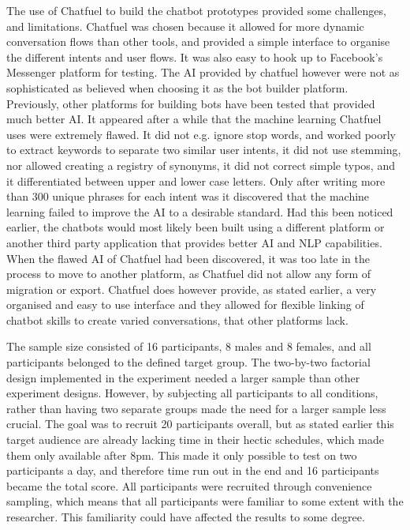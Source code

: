 The use of Chatfuel to build the chatbot prototypes provided some challenges, and limitations. Chatfuel was chosen because it allowed for more dynamic conversation flows than other tools, and provided a simple interface to organise the different intents and user flows. It was also easy to hook up to Facebook's Messenger platform for testing. The AI provided by chatfuel however were not as sophisticated as believed when choosing it as the bot builder platform. Previously, other platforms for building bots have been tested that provided much better AI. It appeared after a while that the machine learning Chatfuel uses were extremely flawed. It did not e.g. ignore stop words, and worked poorly to extract keywords to separate two similar user intents, it did not use stemming, nor allowed creating a registry of synonyms, it did not correct simple typos, and it differentiated between upper and lower case letters. Only after writing more than 300 unique phrases for each intent was it discovered that the machine learning failed to improve the AI to a desirable standard. Had this been noticed earlier, the chatbots would most likely been built using a different platform or another third party application that provides better AI and NLP capabilities. When the flawed AI of Chatfuel had been discovered, it was too late in the process to move to another platform, as Chatfuel did not allow any form of migration or export. Chatfuel does however provide, as stated earlier, a very organised and easy to use interface and they allowed for flexible linking of chatbot skills to create varied conversations, that other platforms lack. 

The sample size consisted of 16 participants, 8 males and 8 females, and all participants belonged to the defined target group. The two-by-two factorial design implemented in the experiment needed a larger sample than other experiment designs. However, by subjecting all participants to all conditions, rather than having two separate groups made the need for a larger sample less crucial. The goal was to recruit 20 participants overall, but as stated earlier this target audience are already lacking time in their hectic schedules, which made them only available after 8pm. This made it only possible to test on two participants a day, and therefore time run out in the end and 16 participants became the total score. All participants were recruited through convenience sampling, which means that all participants were familiar to some extent with the researcher. This familiarity could have affected the results to some degree.
